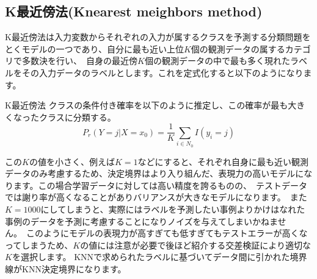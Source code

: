 \documentclass[uplatex]{jsarticle}
\begin{document}
\subsection{K最近傍法(Knearest meighbors method)}
K最近傍法は入力変数からそれぞれの入力が属するクラスを予測する分類問題をとくモデルの一つであり、自分に最も近い上位$K$個の観測データの属するカテゴリで多数決を行い、\
自身の最近傍$K$個の観測データの中で最も多く現れたラベルをその入力データのラベルとします。これを定式化すると以下のようになります。
\begin{itembox}[l]{K最近傍法}
  クラスの条件付き確率を以下のように推定し、この確率が最も大きくなったクラスに分類する。
    $$P_r(Y = j|X = x_0) = \frac{1}{K}\sum_{i \in N_0} I(y_i = j)$$
\end{itembox}
この$K$の値を小さく、例えば$K = 1$などにすると、それぞれ自身に最も近い観測データのみ考慮するため、決定境界はより入り組んだ、表現力の高いモデルになります。この場合学習データに対しては高い精度を誇るものの、\
テストデータでは謝り率が高くなることがありバリアンスが大きなモデルになります。\
また$K = 1000$にしてしまうと、実際にはラベルを予測したい事例よりかけはなれた事例のデータを予測に考慮することになりノイズを与えてしまいかねません。\
このようにモデルの表現力が高すぎても低すぎてもテストエラーが高くなってしまうため、$K$の値には注意が必要で後ほど紹介する交差検証により適切な$K$を選択します。
KNNで求められたラベルに基づいてデータ間に引かれた境界線がKNN決定境界になります。\
\end{document}
